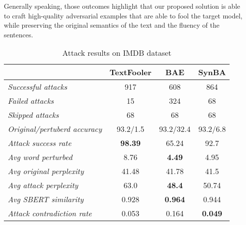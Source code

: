 Generally speaking, those outcomes highlight that our proposed solution is able to craft high-quality adversarial examples that are able to fool the target model, while preserving the original semantics of the text and the fluency of the sentences.

\begin{table}[h]
    \footnotesize
    \centering
    \begin{tabular}{|l|c|c|c|}
        \hline
        {} &           \textbf{TextFooler} &   \textbf{BAE} &    \textbf{SynBA} \\
        \hline \hline
        \emph{Successful attacks}            &      917 &             608 &               864 \\
        \emph{Failed  attacks}                &       15 &             324 &                68 \\
        \emph{Skipped  attacks }             &       68 &              68 &                68 \\
        \emph{Original/pertuberd accuracy}    &     93.2/1.5 &            93.2/32.4 &              93.2/6.8 \\
        \emph{Attack success rate}            &    \textbf{98.39} &           65.24 &              92.7 \\
        \emph{Avg word perturbed }            &     8.76 &            \textbf{4.49} &              4.95 \\
        \emph{Avg original perplexity }       &    41.48 &           41.78 &              41.5 \\
        \emph{Avg attack perplexity}          &     63.0 &            \textbf{48.4} &             50.74 \\
        \emph{Avg SBERT similarity }          &    0.928 &           \textbf{0.964} &             0.944 \\
        \emph{Attack contradiction rate}      &    0.053 &           0.164 &             \textbf{0.049} \\
        \hline
        \end{tabular}
    \caption{Attack results on IMDB dataset}
    \label{tab:results-imdb}
\end{table}

